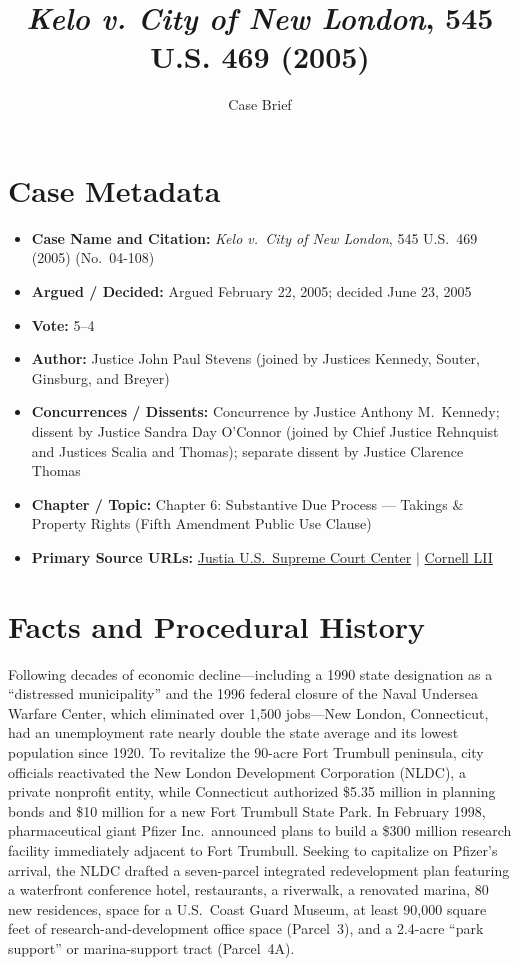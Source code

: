 \documentclass[12pt]{article}
\title{\textit{Kelo v. City of New London}, 545 U.S. 469 (2005)}
\author{Case Brief}
\date{}
\begin{document}
\maketitle

\section{Case Metadata}
\begin{itemize}
  \item \textbf{Case Name and Citation:} \textit{Kelo v.\ City of New London}, 545 U.S.\ 469 (2005) (No.\ 04-108)
  \item \textbf{Argued / Decided:} Argued February 22, 2005; decided June 23, 2005
  \item \textbf{Vote:} 5--4
  \item \textbf{Author:} Justice John Paul Stevens (joined by Justices Kennedy, Souter, Ginsburg, and Breyer)
  \item \textbf{Concurrences / Dissents:} Concurrence by Justice Anthony M.\ Kennedy; dissent by Justice Sandra Day O'Connor (joined by Chief Justice Rehnquist and Justices Scalia and Thomas); separate dissent by Justice Clarence Thomas
  \item \textbf{Chapter / Topic:} Chapter 6: Substantive Due Process --- Takings \& Property Rights (Fifth Amendment Public Use Clause)
  \item \textbf{Primary Source URLs:} \href{https://supreme.justia.com/cases/federal/us/545/469/}{Justia U.S.\ Supreme Court Center} $|$ \href{https://www.law.cornell.edu/supct/html/04-108.ZO.html}{Cornell LII}
\end{itemize}

\section{Facts and Procedural History}
Following decades of economic decline---including a 1990 state designation as a ``distressed municipality'' and the 1996 federal closure of the Naval Undersea Warfare Center, which eliminated over 1,500 jobs---New London, Connecticut, had an unemployment rate nearly double the state average and its lowest population since 1920. To revitalize the 90-acre Fort Trumbull peninsula, city officials reactivated the New London Development Corporation (NLDC), a private nonprofit entity, while Connecticut authorized \$5.35 million in planning bonds and \$10 million for a new Fort Trumbull State Park. In February 1998, pharmaceutical giant Pfizer Inc.\ announced plans to build a \$300 million research facility immediately adjacent to Fort Trumbull. Seeking to capitalize on Pfizer's arrival, the NLDC drafted a seven-parcel integrated redevelopment plan featuring a waterfront conference hotel, restaurants, a riverwalk, a renovated marina, 80 new residences, space for a U.S.\ Coast Guard Museum, at least 90,000 square feet of research-and-development office space (Parcel~3), and a 2.4-acre ``park support'' or marina-support tract (Parcel~4A).
\end{document}
